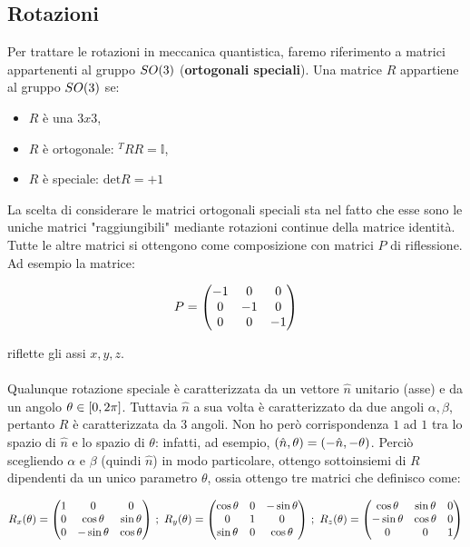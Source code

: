 \subsection{Rotazioni}

	Per trattare le rotazioni in meccanica quantistica, faremo riferimento a matrici appartenenti al gruppo $SO\qty(3)$ (\textbf{ortogonali speciali}). Una matrice $R$ appartiene al gruppo $SO\qty(3)$ se:
	
\begin{itemize}
	\item $R$ è una $3 x 3$, 
	\item $R$ è ortogonale: $^TRR = \mathbb{I}$, 
	\item $R$ è speciale: $\text{det} R = +1$
\end{itemize}

	La scelta di considerare le matrici ortogonali speciali sta nel fatto che esse sono le uniche matrici "raggiungibili" mediante rotazioni continue della matrice identità. Tutte le altre matrici si ottengono come composizione con matrici $P$ di riflessione. Ad esempio la matrice:
	
\begin{align*}
	P = \mqty( -1 & 0 & 0 \\ 0 & -1 & 0 \\ 0 & 0 & -1)
\end{align*}

	riflette gli assi $x, y, z$. 
	\\
	\\
	Qualunque rotazione speciale è caratterizzata da un vettore $\hat{n}$ unitario (asse) e da un angolo $\theta \in \qty[0, 2\pi]$. Tuttavia $\hat{n}$ a sua volta è caratterizzato da due angoli $\alpha, \beta$, pertanto $R$ è caratterizzata da $3$ angoli. Non ho però corrispondenza $1$ ad $1$ tra lo spazio di $\hat{n}$ e lo spazio di $\theta$: infatti, ad esempio, $\qty(\hat{n}, \theta) = \qty(- \hat{n}, - \theta)$. Perciò scegliendo $\alpha$ e $\beta$ (quindi $\hat{n}$) in modo particolare, ottengo sottoinsiemi di $R$ dipendenti da un unico parametro $\theta$, ossia ottengo tre matrici che definisco come:
	
\begin{align*}
	R_x\qty(\theta) = \mqty( 1 & 0 & 0 \\ 0 & \cos\theta & \sin\theta \\ 0 & -\sin\theta & \cos\theta) \,\, ; \,\, R_y\qty(\theta) = \mqty( \cos\theta & 0 & -\sin\theta \\ 0 & 1 & 0 \\ \sin\theta & 0 & \cos\theta) \,\, ; \, \, R_z\qty(\theta) = \mqty( \cos\theta & \sin\theta & 0 \\ -\sin\theta & \cos\theta & 0 \\ 0 & 0 & 1)
\end{align*}

